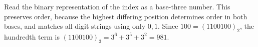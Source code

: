 Read the binary representation of the index as a base-three number. This preserves order, because the highest differing position determines order in both bases, and matches all digit strings using only $0,1$. Since $100=(1100100)_2$, the hundredth term is $(1100100)_3=3^6+3^5+3^2=\boxed{981}$.

